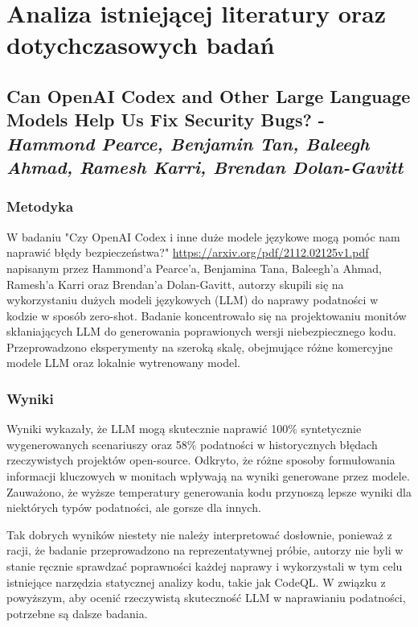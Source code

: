 
\chapter{Analiza istniejącej literatury oraz dotychczasowych badań}

\section{Can OpenAI Codex and Other Large Language Models Help Us Fix Security Bugs? - \scriptsize\textit{Hammond Pearce, Benjamin Tan, Baleegh Ahmad, Ramesh Karri, Brendan Dolan-Gavitt}}

\subsection{Metodyka}
W badaniu "Czy OpenAI Codex i inne duże modele językowe mogą pomóc nam naprawić błędy bezpieczeństwa?"\cite{codex-fix-security-bugs} \url{https://arxiv.org/pdf/2112.02125v1.pdf} napisanym przez Hammond'a Pearce'a, Benjamina Tana, Baleegh'a Ahmad, Ramesh'a Karri oraz Brendan'a Dolan-Gavitt, autorzy skupili się na wykorzystaniu dużych modeli językowych (LLM) do naprawy podatności w kodzie w sposób zero-shot. Badanie koncentrowało się na projektowaniu monitów skłaniających LLM do generowania poprawionych wersji niebezpiecznego kodu. Przeprowadzono eksperymenty na szeroką skalę, obejmujące różne komercyjne modele LLM oraz lokalnie wytrenowany model.

\subsection{Wyniki}
Wyniki wykazały, że LLM mogą skutecznie naprawić 100\% syntetycznie wygenerowanych scenariuszy oraz 58\% podatności w historycznych błędach rzeczywistych projektów open-source. Odkryto, że różne sposoby formułowania informacji kluczowych w monitach wpływają na wyniki generowane przez modele. Zauważono, że wyższe temperatury generowania kodu przynoszą lepsze wyniki dla niektórych typów podatności, ale gorsze dla innych. 

Tak dobrych wyników niestety nie należy interpretować dosłownie, ponieważ z racji, że badanie przeprowadzono na reprezentatywnej próbie, autorzy nie byli w stanie ręcznie sprawdzać poprawności każdej naprawy i wykorzystali w tym celu istniejące narzędzia statycznej analizy kodu, takie jak CodeQL. W związku z powyższym, aby ocenić rzeczywistą skuteczność LLM w naprawianiu podatności, potrzebne są dalsze badania.
